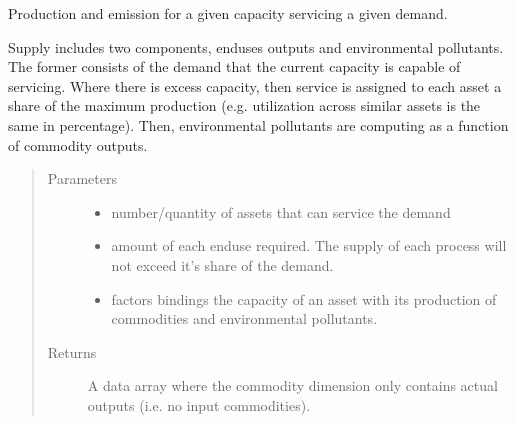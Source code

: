 \documentclass[letterpaper,10pt,english]{sphinxmanual}
\begin{document}

\begin{fulllineitems}
\label{\detokenize{api:muse.quantities.supply}}
Production and emission for a given capacity servicing a given demand.

Supply includes two components, end\sphinxhyphen{}uses outputs and environmental pollutants. The
former consists of the demand that the current capacity is capable of servicing.
Where there is excess capacity, then service is assigned to each asset a share of
the maximum production (e.g. utilization across similar assets is the same in
percentage). Then, environmental pollutants are computing as a function of
commodity outputs.
\begin{quote}\begin{description}
\item[{Parameters}] \leavevmode\begin{itemize}
\item {} 
 \textendash{} number/quantity of assets that can service the demand

\item {} 
 \textendash{} amount of each end\sphinxhyphen{}use required. The supply of each process will not
exceed it’s share of the demand.

\item {} 
 \textendash{} factors bindings the capacity of an asset with its production of
commodities and environmental pollutants.

\end{itemize}

\item[{Returns}] \leavevmode
A data array where the commodity dimension only contains actual outputs (i.e. no
input commodities).

\end{description}\end{quote}

\end{fulllineitems}
\end{document}
